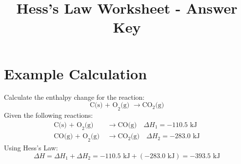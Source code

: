 \documentclass{article}
\title{Hess's Law Worksheet - Answer Key}
\author{}
\date{}
\begin{document}
\maketitle

\section*{Example Calculation}
Calculate the enthalpy change for the reaction:
\[
\text{C(s) + O}_2\text{(g) } \rightarrow \text{CO}_2\text{(g)}
\]
Given the following reactions:
\begin{align*}
\text{C(s) + O}_2\text{(g) } &\rightarrow \text{CO(g)} \quad \Delta H_1 = -110.5 \text{ kJ} \\
\text{CO(g) + O}_2\text{(g) } &\rightarrow \text{CO}_2\text{(g)} \quad \Delta H_2 = -283.0 \text{ kJ}
\end{align*}
Using Hess's Law:
\[
\Delta H = \Delta H_1 + \Delta H_2 = -110.5 \text{ kJ} + (-283.0 \text{ kJ}) = -393.5 \text{ kJ}
\]
\end{document}
